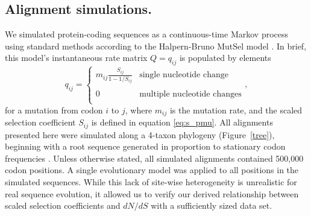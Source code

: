 \documentclass[11pt]{article}
\begin{document}
\subsection*{Alignment simulations.}
We simulated protein-coding sequences as a continuous-time Markov process using standard methods \citep{Yang2006} according to the Halpern-Bruno MutSel model \citep{HalpernBruno1998}. In brief, this model's instantaneous rate matrix $Q = q_{ij}$ is populated by elements
\begin{equation}\label{eq:HBmatrix}
q_{ij} = \left\{ 
\begin{array}{rl}
m_{ij} \frac{S_{ij}}{1-1/S_{ij}} &\text{single nucleotide change} \\\\
0                                  &\text{multiple nucleotide changes} \\             
\end{array} \right.,
\end{equation} for a mutation from codon $i$ to $j$, where $m_{ij}$ is the mutation rate, and the scaled selection coefficient $S_{ij}$ is defined in equation \eqref{eq:s_pmu}. All alignments presented here were simulated along a 4-taxon phylogeny (Figure~\ref{tree}), beginning with a root sequence generated in proportion to  stationary codon frequencies \citep{Yang2006}. Unless otherwise stated, all simulated alignments contained 500,000 codon positions. A single evolutionary model was applied to all positions in the simulated sequences. While this lack of site-wise heterogeneity is unrealistic for real sequence evolution, it allowed us to verify our derived relationship between scaled selection coefficients and $dN/dS$ with a sufficiently sized data set. 
\end{document}
